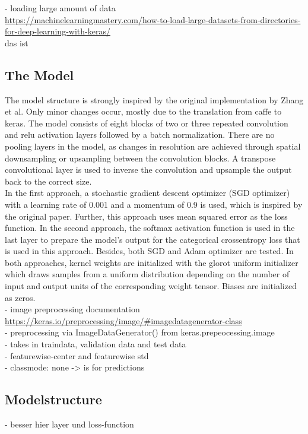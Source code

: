 \documentclass[12pt,letterpaper]{article}
\begin{document}
- loading large amount of data\\
\url{https://machinelearningmastery.com/how-to-load-large-datasets-from-directories-for-deep-learning-with-keras/}\\
das ist \citep{Brownlee.2019}
\subsection{The Model}
The model structure is strongly inspired by the original implementation by Zhang et al. Only minor changes occur, mostly due to the translation from caffe to keras. The model consists of eight blocks of two or three repeated convolution and relu activation layers followed by a batch normalization. There are no pooling layers in the model, as changes  in  resolution  are  achieved  through  spatial  downsampling  or  upsampling between the convolution blocks. A transpose convolutional layer is used to inverse the convolution and upsample the output back to the correct size.\\
In the first approach, a stochastic gradient descent optimizer (SGD optimizer) with a learning rate of 0.001 and a momentum of 0.9 is used, which is inspired by the original paper. Further, this approach uses mean squared error as the loss function. In the second approach, the softmax activation function is used in the last layer to prepare the model's output for the categorical crossentropy loss that is used in this approach. Besides, both SGD and Adam optimizer are tested. In both approaches, kernel weights are initialized with the glorot uniform initializer which draws samples from a uniform distribution depending on the number of input and output units of the corresponding weight tensor. Biases are initialized as zeros.\\


- image preprocessing documentation\\
\url{https://keras.io/preprocessing/image/#imagedatagenerator-class}\\
- preprocessing via ImageDataGenerator() from keras.prepeocessing.image\\
- takes in traindata, validation data and test data\\
- featurewise-center and featurewise std\\
- classmode: none -> is for predictions\\

\subsection{Modelstructure}
- besser hier layer und loss-function
\end{document}
